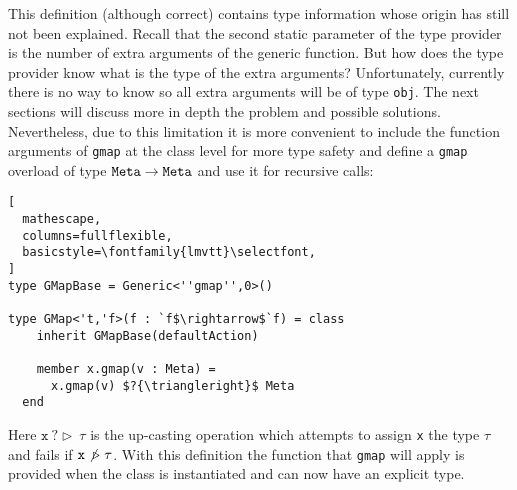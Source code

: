 \documentclass{sigplanconf}
\begin{document}
This definition (although correct) contains type information whose
origin has still not been explained. Recall that the second static
parameter of the type provider is the number of extra arguments of the
generic function. But how does the type provider know what is the type
of the extra arguments? Unfortunately, currently there is no way to
know so all extra arguments will be of type \verb+obj+. The next
sections will discuss more in depth the problem and possible
solutions. Nevertheless, due to this limitation it is more convenient
to include the function arguments of \verb+gmap+ at the class level
for more type safety and define a \verb+gmap+ overload of type
$\mathtt{Meta}\rightarrow\mathtt{Meta}$ and use it for recursive calls:
\begin{lstlisting}[
  mathescape,
  columns=fullflexible,
  basicstyle=\fontfamily{lmvtt}\selectfont,
]
type GMapBase = Generic<''gmap'',0>()

type GMap<'t,'f>(f : `f$\rightarrow$`f) = class
    inherit GMapBase(defaultAction)

    member x.gmap(v : Meta) =
      x.gmap(v) $?{\triangleright}$ Meta
  end
\end{lstlisting}
Here $\mathtt{x}\ ?{\triangleright}\ \tau$ is the up-casting operation which
attempts to assign \verb+x+ the type $\tau$ and fails if $\mathtt{x}
\not\triangleright\ \tau$. With this definition the function that \verb+gmap+ will
apply is provided when the class is instantiated and can now have an
explicit type.
\end{document}
